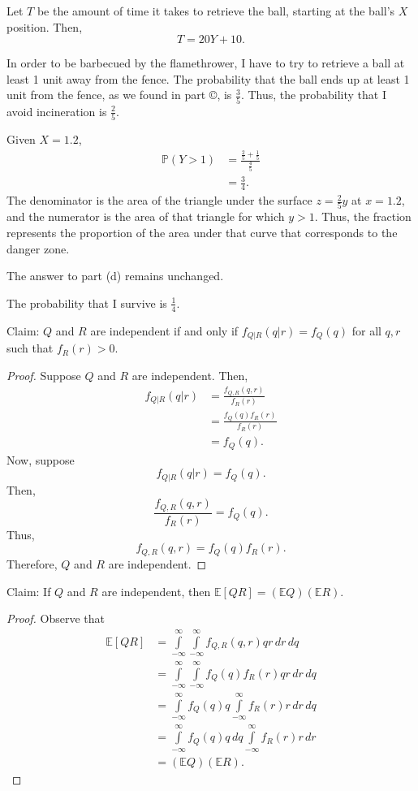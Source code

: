 \documentclass[12pt]{article}
\begin{document}
\newpage
{}

    Let $T$ be the amount of time it takes to retrieve the ball, starting at the ball's $X$ position. Then, $$T = 20Y + 10.$$

\medskip
{}

    In order to be barbecued by the flamethrower, I have to try to retrieve a ball at least 1 unit away from the fence. The probability that the ball ends up at least 1 unit from the fence, as we found in part \copyright, is $\frac35$. Thus, the probability that I avoid incineration is $\frac25$.

\medskip
{} Given $X=1.2$,
\begin{align*}
    \mathbb P(Y > 1) &= \frac{\frac25 + \frac15}{\frac45} \\
                     &= \frac34.
\end{align*} The denominator is the area of the triangle under the surface $z=\frac25y$ at $x=1.2$, and the numerator is the area of that triangle for which $y > 1$. Thus, the fraction represents the proportion of the area under that curve that corresponds to the danger zone.

The answer to part (d) remains unchanged.

The probability that I survive is $\frac14$.

\newpage
{}

\medskip
{} Claim: $Q$ and $R$ are independent if and only if $f_{Q|R}(q|r) = f_Q(q)$ for all $q,r$ such that $f_R(r) > 0$.
\begin{proof}
    Suppose $Q$ and $R$ are independent. Then,
    \begin{align*}
        f_{Q|R}(q|r) &= \frac{f_{Q,R}(q,r)}{f_R(r)} \\
                     &= \frac{f_Q(q)f_R(r)}{f_R(r)} \\
                     &= f_Q(q).
    \end{align*}
    Now, suppose $$f_{Q|R}(q|r) = f_Q(q).$$ Then, $$\frac{f_{Q,R}(q,r)}{f_R(r)} = f_Q(q).$$ Thus, $$f_{Q,R}(q,r) = f_Q(q)f_R(r).$$ Therefore, $Q$ and $R$ are independent.
\end{proof}

\medskip
{} Claim: If $Q$ and $R$ are independent, then $\mathbb E[QR] = (\mathbb EQ)(\mathbb ER)$.
\begin{proof}
    Observe that
    \begin{align*}
        \mathbb E[QR] &= \int\limits_{-\infty}^\infty \int\limits_{-\infty}^\infty f_{Q,R}(q,r) qr\,dr\,dq \\
                      &= \int\limits_{-\infty}^\infty \int\limits_{-\infty}^\infty f_Q(q)f_R(r) qr\,dr\,dq \\
                      &= \int\limits_{-\infty}^\infty f_Q(q)q \int\limits_{-\infty}^\infty f_R(r) r\,dr\,dq \\
                      &= \int\limits_{-\infty}^\infty f_Q(q)q \,dq\int\limits_{-\infty}^\infty f_R(r) r\,dr \\
                      &= (\mathbb EQ)(\mathbb ER).
    \end{align*}
\end{proof}
\end{document}
